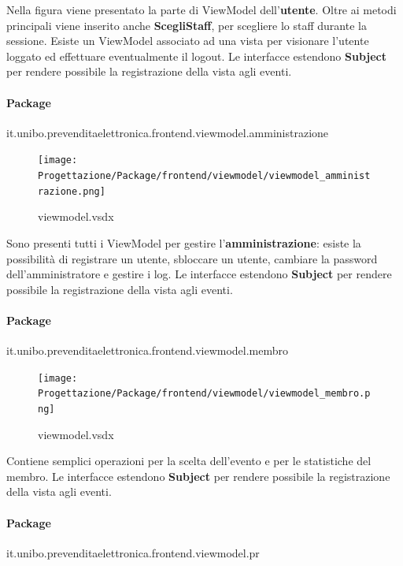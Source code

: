 \documentclass[a4paper]{article}
\begin{document}
Nella figura viene presentato la parte di ViewModel dell'\textbf{utente}. Oltre ai metodi principali viene inserito anche \textbf{ScegliStaff}, per scegliere lo staff durante la sessione. Esiste un ViewModel associato ad una vista per visionare l'utente loggato ed effettuare eventualmente il logout. Le interfacce estendono \textbf{Subject} per rendere possibile la registrazione della vista agli eventi.

\newpage

\paragraph{Package} it.unibo.prevenditaelettronica.frontend.viewmodel.amministrazione


\begin{figure}[H]
    \texttt{[image: Progettazione/Package/frontend/viewmodel/viewmodel\_amministrazione.png]}
    \centering
    \caption{viewmodel.vsdx}
\end{figure}

Sono presenti tutti i ViewModel per gestire l'\textbf{amministrazione}: esiste la possibilità di registrare un utente, sbloccare un utente, cambiare la password dell'amministratore e gestire i log. Le interfacce estendono \textbf{Subject} per rendere possibile la registrazione della vista agli eventi.

\paragraph{Package} it.unibo.prevenditaelettronica.frontend.viewmodel.membro

\begin{figure}[H]
    \texttt{[image: Progettazione/Package/frontend/viewmodel/viewmodel\_membro.png]}
    \centering
    \caption{viewmodel.vsdx}
\end{figure}

Contiene semplici operazioni per la scelta dell'evento e per le statistiche del membro.  Le interfacce estendono \textbf{Subject} per rendere possibile la registrazione della vista agli eventi.

\newpage

\paragraph{Package} it.unibo.prevenditaelettronica.frontend.viewmodel.pr
\end{document}
